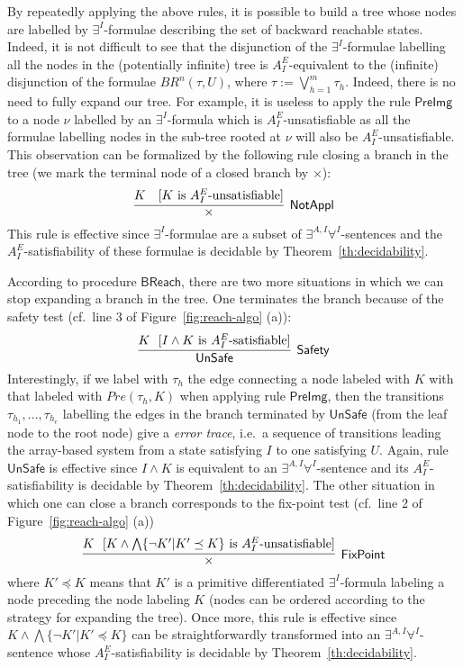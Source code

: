 \documentclass{LMCS}
\theoremstyle{plain}\newtheorem{assumption}[thm]{Assumption}
\theoremstyle{plain}\newtheorem{proposition}[thm]{Proposition}
\theoremstyle{plain}\newtheorem{property}[thm]{Property}
\theoremstyle{plain}\newtheorem{example}[thm]{Example}
\theoremstyle{plain}\newtheorem{claim}[thm]{Claim}
\theoremstyle{plain}\newtheorem{lemma}[thm]{Lemma}
\begin{document}
By repeatedly applying the above rules, it is possible to build a tree
whose nodes are labelled by $\exists^I$-formulae describing the set of
backward reachable states.  Indeed, it is not difficult to see that
the disjunction of the $\exists^I$-formulae labelling all the nodes in
the (potentially infinite) tree is $A_I^E$-equivalent to
the (infinite) disjunction of the formulae $BR^n(\tau,U)$, where $\tau:=\bigvee_{h=1}^m \tau_h$.  Indeed, there is
no need to fully expand our tree.  For example, it is useless to apply
the rule $\mathsf{PreImg}$ to a node $\nu$ labelled by an
$\exists^I$-formula which is $A_I^E$-unsatisfiable as all the formulae
labelling nodes in the sub-tree rooted at $\nu$ will also be
$A_I^E$-unsatisfiable.  This observation can be formalized by the
following rule closing a branch in the tree (we mark the terminal node
of a closed branch by $\times$):
\begin{displaymath}
  \infer[\mathsf{NotAppl}]{ \times
}{K\mbox{ ~~[$K$ is $A_I^E$-unsatisfiable}]}
\end{displaymath}
This rule is effective since $\exists^I$-formulae are a subset of
$\exists^{A,I}\forall^I$-sentences and the $A_I^E$-sa\-tis\-fia\-bi\-li\-ty of
these formulae is decidable by Theorem~\ref{th:decidability}.

According to procedure $\mathsf{BReach}$, there are two more
situations in which we can stop expanding a branch in the tree.  One
terminates the branch because of the safety test (cf.\ line 3 of
Figure~\ref{fig:reach-algo} (a)):
\begin{displaymath}
  \infer[\mathsf{Safety}]{\mathsf{UnSafe} }
        {K ~~[I\wedge K\mbox{ is $A_I^E$-satisfiable}]}
\end{displaymath}
Interestingly, if we label with $\tau_h$ the edge connecting a node
labeled with $K$ with that labeled with $Pre(\tau_h, K)$ when applying
rule $\mathsf{PreImg}$, then the transitions $\tau_{h_1}, ...,
\tau_{h_e}$ labelling the edges in the branch terminated by
$\mathsf{UnSafe}$ (from the leaf node to the root node) give a
\emph{error trace}, i.e.\ a sequence of transitions leading the
array-based system from a state satisfying $I$ to one satisfying $U$.
Again, rule $\mathsf{UnSafe}$ is effective since $I\wedge K$ is
equivalent to an $\exists^{A,I}\forall^I$-sentence and its
$A_I^E$-satisfiability is decidable by Theorem~\ref{th:decidability}.
The other situation in which one can close a branch corresponds to the
fix-point test (cf.\ line 2 of Figure~\ref{fig:reach-algo} (a))
\begin{displaymath}
  \infer[\mathsf{FixPoint}]{\times }{K~~[K\wedge \bigwedge \{\neg K'\vert K'\preceq K\}\mbox{ is $A_I^E$-unsatisfiable}]}
\end{displaymath}
where $K'\preceq K$ means that $K'$ is a primitive differentiated
$\exists^I$-formula labeling a node preceding the node labeling $K$
(nodes can be ordered according to the strategy for expanding the
tree).
Once more, this rule is effective since $K\wedge \bigwedge \{\neg
K'\vert K'\preceq K\}$ can be straightforwardly transformed into an
$\exists^{A,I}\forall^I$-sentence
whose $A_I^E$-satisfiability is decidable by
Theorem~\ref{th:decidability}.
\end{document}
